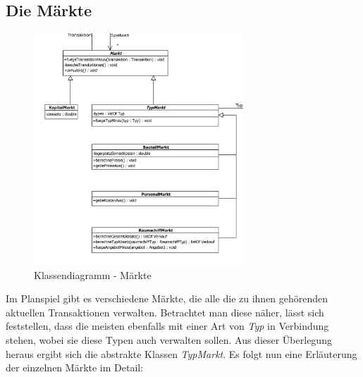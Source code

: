 \subsection{Die Märkte}
\begin{figure}[htb]
     \centering
     \includegraphics[width=0.7\textwidth]{30_Fachkonzept/20_Entwurf/markt}
     \caption{Klassendiagramm - Märkte}
     \label{img:fachkonzept-entwurf-markt}
\end{figure}

Im Planspiel gibt es verschiedene Märkte, die alle die zu ihnen gehörenden aktuellen Transaktionen verwalten. Betrachtet man diese näher, lässt sich feststellen, dass die meisten ebenfalls mit einer Art von \textit{Typ} in Verbindung stehen, wobei sie diese Typen auch verwalten sollen. Aus dieser Überlegung heraus ergibt sich die abstrakte Klassen \textit{TypMarkt}. Es folgt nun eine Erläuterung der einzelnen Märkte im Detail:

